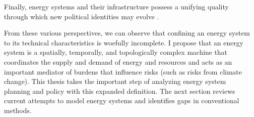 Finally, energy systems and their infrastructure possess a unifying quality
through which new political identities may evolve \cite{bridge_energy_2018}.

From these various perspectives, we can observe that confining an energy system
to its technical characteristics is woefully incomplete. I propose that an
energy system is a spatially, temporally, and topologically complex machine that
coordinates the supply and demand of energy and resources and acts as an
important mediator of burdens that influence risks (such as risks from climate
change). This thesis takes the important step of analyzing energy system
planning and policy with this expanded definition. The next section reviews
current attempts to model energy systems and identifies gaps in conventional
methods.









